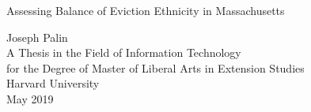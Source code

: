 
\thispagestyle{empty}
\begin{center}

  \vspace*{0.6in}
  Assessing Balance of Eviction Ethnicity in Massachusetts

  \vspace{2.3in}
  Joseph Palin\\
  \vspace{1.8in}
  A Thesis in the Field of Information Technology\\
  for the Degree of Master of Liberal Arts in Extension Studies\\
  \vspace{.8in}
  Harvard University\\

  \vfill
  May 2019
  \vspace*{.5in}
\end{center}




